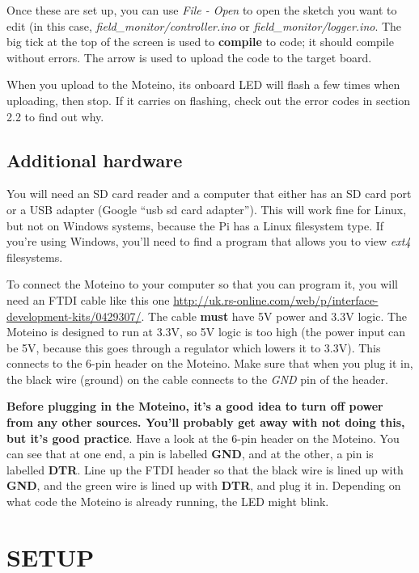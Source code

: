 \documentclass[10pt]{article}
\begin{document}
Once these are set up, you can use \textit{File - Open} to open the sketch you want to edit (in this case, \textit{field\_monitor/controller.ino} or \textit{field\_monitor/logger.ino}. The big tick at the top of the screen is used to \textbf{compile} to code; it should compile without errors. The arrow is used to upload the code to the target board. 

When you upload to the Moteino, its onboard LED will flash a few times when uploading, then stop. If it carries on flashing, check out the error codes in section 2.2 to find out why.

\subsection{Additional hardware}
You will need an SD card reader and a computer that either has an SD card port or a USB adapter (Google ``usb sd card adapter''). This will work fine for Linux, but not on Windows systems, because the Pi has a Linux filesystem type. If you're using Windows, you'll need to find a program that allows you to view \textit{ext4} filesystems.

To connect the Moteino to your computer so that you can program it, you will need an FTDI cable like this one
\url{http://uk.rs-online.com/web/p/interface-development-kits/0429307/}. The cable \textbf{must} have 5V power and 3.3V logic. The Moteino is designed to run at 3.3V,
so 5V logic is too high (the power input can be 5V, because this goes through a regulator which lowers it to 3.3V). This connects to the 6-pin header on the Moteino. Make
sure that when you plug it in, the black wire (ground) on the cable connects to the \textit{GND} pin of the header. \newline

\textbf{Before plugging in the Moteino, it's a good idea to turn off power from any other sources. You'll probably get away with not doing this, but it's good practice}. 
Have a look at the 6-pin header on the Moteino. You can see that at one end, a pin is labelled \textbf{GND}, and at the other, a pin is labelled \textbf{DTR}. Line up the FTDI header so that the black wire is lined up with \textbf{GND}, and the green wire is lined up with \textbf{DTR}, and plug it in. Depending on what code the Moteino is already running, the LED might blink.

\section{SETUP}
\end{document}
